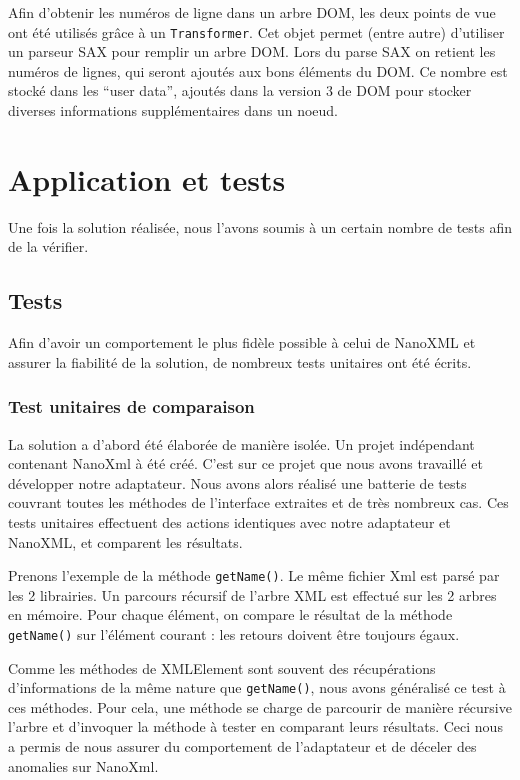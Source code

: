 Afin d'obtenir les numéros de ligne dans un arbre DOM, les deux points de vue ont été utilisés grâce à un \verb|Transformer|.
Cet objet permet (entre autre) d'utiliser un parseur SAX pour remplir un arbre DOM.
Lors du parse SAX on retient les numéros de lignes, qui seront ajoutés aux bons éléments du DOM.
Ce nombre est stocké dans les ``user data'', ajoutés dans la version 3  de DOM pour stocker diverses informations supplémentaires dans un noeud.

\section{Application et tests}
Une fois la solution réalisée, nous l'avons soumis à un certain nombre de tests afin de la vérifier.
\subsection{Tests}
Afin d'avoir un comportement le plus fidèle possible à celui de NanoXML et assurer la fiabilité de la solution, de nombreux tests unitaires ont été écrits.
\subsubsection{Test unitaires de comparaison}
La solution a d'abord été élaborée de manière isolée.
Un projet indépendant contenant NanoXml à été créé.
C'est sur ce projet que nous avons travaillé et développer notre adaptateur.
Nous avons alors réalisé une batterie de tests couvrant toutes les méthodes de l'interface extraites et de très nombreux cas.
Ces tests unitaires effectuent des actions identiques avec notre adaptateur et NanoXML, et comparent les résultats.

Prenons l'exemple de la méthode \verb|getName()|. Le même fichier Xml est parsé par les 2 librairies.
Un parcours récursif de l'arbre XML est effectué sur les 2 arbres en mémoire.
Pour chaque élément, on compare le résultat de la méthode \verb|getName()| sur l'élément courant : les retours doivent être toujours égaux.

Comme les méthodes de XMLElement sont souvent des récupérations d'informations de la même nature que \verb|getName()|, nous avons généralisé ce test à ces méthodes.
Pour cela, une méthode se charge de parcourir de manière récursive l'arbre et d'invoquer la méthode à tester en comparant leurs résultats.
Ceci nous a permis de nous assurer du comportement de l'adaptateur et de déceler des anomalies sur NanoXml.

